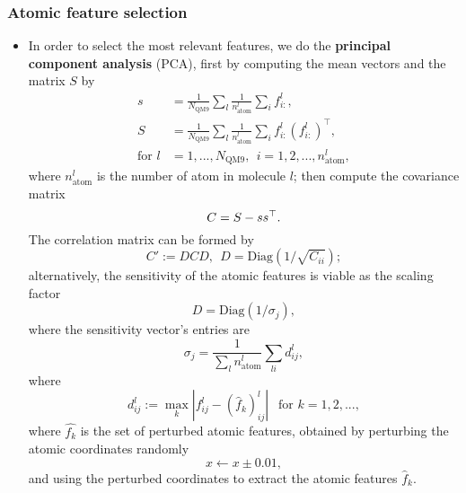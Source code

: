 \documentclass[12pt]{article}
\begin{document}
\subsubsection{Atomic feature selection}
\begin{itemize}
	\item In order to select the most relevant features, we do the \textbf{principal component analysis} (PCA), first by computing the mean vectors and the matrix $S$ by
	\begin{equation}
		\begin{split}
			s &= \frac{1}{N_\text{QM9}}\sum_{l} \frac{1}{n^l_\text{atom}}\sum_{i} f^l_{i:}, \\ 
			S &= \frac{1}{N_\text{QM9}}\sum_{l} \frac{1}{n^l_\text{atom}} \sum_{i} f^l_{i:} (f^l_{i:})^\top, \\ 
			\text{for } l &= 1,...,N_\text{QM9}, ~~ i = 1,2,...,n^l_\text{atom},
		\end{split}
	\end{equation}
	where $n^l_\text{atom}$ is the number of atom in molecule $l$; then compute the covariance matrix
	\begin{equation}
		\label{eq:pca_atom_start}
		C = S - ss^\top. \\			
	\end{equation}
	The correlation matrix can be formed by
	\begin{equation}
		C' := DCD, ~~ D = \text{Diag}(1/\sqrt{C_{ii}});
	\end{equation}
	alternatively, the sensitivity of the atomic features is viable as the scaling factor
	\begin{equation}
		D = \text{Diag}(1/\sigma_j),
	\end{equation}
	where the sensitivity vector's entries are
	\begin{equation}
		\sigma_j = \frac{1}{\sum_l n^l_\text{atom}}\sum_{li} d^l_{ij},
	\end{equation}
	where
	\begin{equation}
		d^l_{ij} := \max_k |f^l_{ij} - (\hat{f}_k)^l_{ij}|~~\text{ for }k = 1,2,...,
	\end{equation}
	where $\hat{f_k}$ is the set of perturbed atomic features, obtained by perturbing the atomic coordinates randomly
	\begin{equation}
		x \leftarrow x \pm 0.01,
	\end{equation}
	and using the perturbed coordinates to extract the atomic features $\hat{f}_k$.


\end{itemize}
\end{document}

